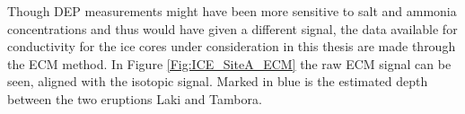 \documentclass[../../CompleteThesis2/Complete_2ndDraft]{subfiles}
\begin{document}
Though DEP measurements might have been more sensitive to salt and ammonia concentrations and thus would have given a different signal, the data available for conductivity for the ice cores under consideration in this thesis are made through the ECM method. In Figure \ref{Fig:ICE_SiteA_ECM} the raw ECM signal can be seen, aligned with the isotopic signal. Marked in blue is the estimated depth between the two eruptions Laki and Tambora.





\end{document}
